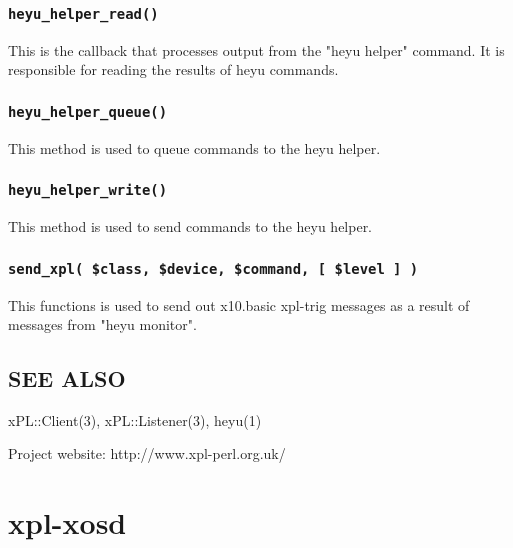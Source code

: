 \subsubsection*{\texttt{heyu\_helper\_read()}\label{xpl-x10_heyu_helper_read_}}


This is the callback that processes output from the "heyu helper"
command.  It is responsible for reading the results of heyu commands.

\subsubsection*{\texttt{heyu\_helper\_queue()}\label{xpl-x10_heyu_helper_queue_}}


This method is used to queue commands to the heyu helper.

\subsubsection*{\texttt{heyu\_helper\_write()}\label{xpl-x10_heyu_helper_write_}}


This method is used to send commands to the heyu helper.

\subsubsection*{\texttt{send\_xpl( \$class, \$device, \$command, [ \$level ] )}\label{xpl-x10_send_xpl_class_device_command_level_}}


This functions is used to send out x10.basic xpl-trig messages as a
result of messages from "heyu monitor".

\subsection*{SEE ALSO\label{xpl-x10_SEE_ALSO}}


xPL::Client(3), xPL::Listener(3), heyu(1)



Project website: http://www.xpl-perl.org.uk/

\section{xpl-xosd\label{xpl-xosd}}


